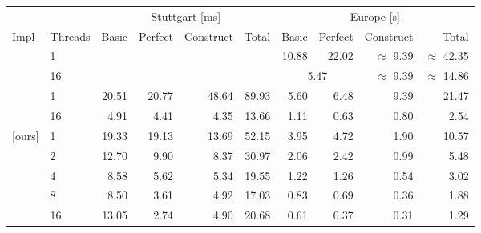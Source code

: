 \begin{tabular}{llrrrrrrrr}
\toprule
& & \multicolumn{4}{c}{Stuttgart [ms]} & \multicolumn{4}{c}{Europe [s]} \\ \cmidrule(lr){3-6} \cmidrule(lr){7-10}
Impl & Threads &     Basic & Perfect & Construct &  Total &  Basic & Perfect & Construct &  Total \\
\midrule
\cite{DibbeltSW16}
& 1           &           &         &           &        &  10.88 &   22.02 & $\approx$ 9.39 & $\approx$ 42.35 \\
& 16          &           &         &           &        & \multicolumn{2}{c}{5.47} & $\approx$ 9.39 & $\approx$ 14.86 \\
\addlinespace
\cite{BuchholdSW19}
& 1           &     20.51 &   20.77 &     48.64 &  89.93 &   5.60 &    6.48 &      9.39 &  21.47 \\
& 16          &      4.91 &    4.41 &      4.35 &  13.66 &   1.11 &    0.63 &      0.80 &   2.54 \\
\addlinespace
{[ours]}
& 1           &     19.33 &   19.13 &     13.69 &  52.15 &   3.95 &    4.72 &      1.90 &  10.57 \\
& 2           &     12.70 &    9.90 &      8.37 &  30.97 &   2.06 &    2.42 &      0.99 &   5.48 \\
& 4           &      8.58 &    5.62 &      5.34 &  19.55 &   1.22 &    1.26 &      0.54 &   3.02 \\
& 8           &      8.50 &    3.61 &      4.92 &  17.03 &   0.83 &    0.69 &      0.36 &   1.88 \\
& 16          &     13.05 &    2.74 &      4.90 &  20.68 &   0.61 &    0.37 &      0.31 &   1.29 \\
\bottomrule
\end{tabular}

